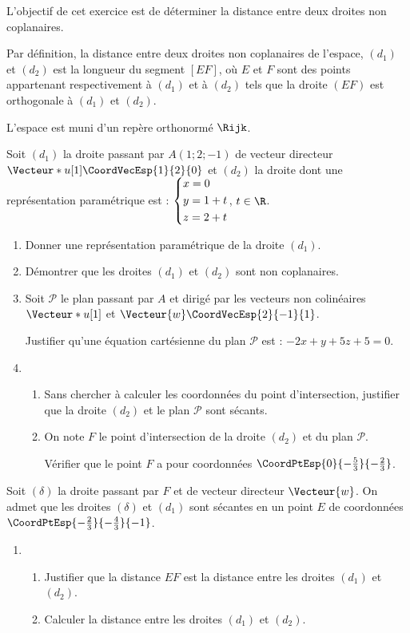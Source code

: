 L’objectif de cet exercice est de déterminer la distance entre deux droites non coplanaires.

\smallskip

Par définition, la distance entre deux droites non coplanaires de l’espace, $(d_1)$ et $(d_2)$ est la longueur du segment $[EF]$, où $E$ et $F$ sont des points appartenant respectivement à $(d_1)$ et à $(d_2)$ tels que la droite $(EF)$ est orthogonale à $(d_1)$ et $(d_2)$.

\smallskip

L’espace est muni d’un repère orthonormé $\Rijk$.

\smallskip

Soit $(d_1)$ la droite passant par $A(1;2;-1)$ de vecteur directeur $\Vecteur*{u}[1] \CoordVecEsp{1}{2}{0}$ et $(d_2)$ la droite dont
une représentation paramétrique est : $\begin{dcases} x = 0 \\ y = 1+ t \\z = 2+ t\end{dcases}$, $t \in \R$.

\begin{enumerate}
	\item  Donner une représentation paramétrique de la droite $(d_1)$.
	\item Démontrer que les droites $(d_1)$ et $(d_2)$ sont non coplanaires.
	\item Soit $\mathcal{P}$ le plan passant par $A$ et dirigé par les vecteurs non colinéaires $\Vecteur*{u}[1]$ et $\Vecteur{w} \CoordVecEsp{2}{-1}{1}$.
	
	Justifier qu’une équation cartésienne du plan $\mathcal{P}$ est : $-2x + y +5z +5 = 0$.
	\item 
	\begin{enumerate}
		\item Sans chercher à calculer les coordonnées du point d’intersection, justifier que la droite $(d_2)$ et le plan $\mathcal{P}$ sont sécants.
		\item On note $F$ le point d’intersection de la droite $(d_2)$ et du plan $\mathcal{P}$.
		
		Vérifier que le point $F$ a pour coordonnées $\CoordPtEsp{0}{-\frac53}{-\frac23}$.
	\end{enumerate}
\end{enumerate}

Soit $(\delta)$ la droite passant par $F$ et de vecteur directeur $\Vecteur{w}$. On admet que les droites $(\delta)$ et $(d_1)$ sont sécantes en un point $E$ de coordonnées $\CoordPtEsp{-\frac23}{-\frac43}{-1}$.

\begin{enumerate}[resume]
	\item 
	\begin{enumerate}
		\item Justifier que la distance $EF$ est la distance entre les droites $(d_1)$ et $(d_2)$.
		\item Calculer la distance entre les droites $(d_1)$ et $(d_2)$.
	\end{enumerate}
\end{enumerate}